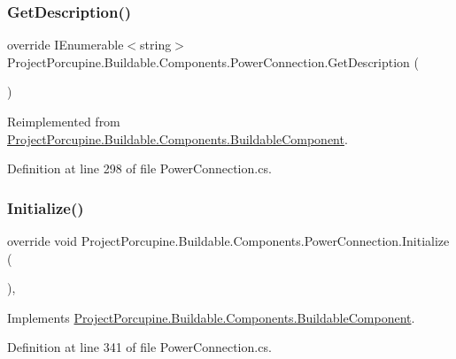 \subsubsection{\texorpdfstring{Get\+Description()}{GetDescription()}}
{\footnotesize\ttfamily override I\+Enumerable$<$string$>$ Project\+Porcupine.\+Buildable.\+Components.\+Power\+Connection.\+Get\+Description (\begin{DoxyParamCaption}{ }\end{DoxyParamCaption})\hspace{0.3cm}{\ttfamily [virtual]}}



Reimplemented from \hyperlink{class_project_porcupine_1_1_buildable_1_1_components_1_1_buildable_component_a78dcaf17ccd463eb4f47fc4b3671b7b5}{Project\+Porcupine.\+Buildable.\+Components.\+Buildable\+Component}.



Definition at line 298 of file Power\+Connection.\+cs.

\mbox{\label{class_project_porcupine_1_1_buildable_1_1_components_1_1_power_connection_a876abd5cb8ac85a2b9b4abae9e645418}} 
\subsubsection{\texorpdfstring{Initialize()}{Initialize()}}
{\footnotesize\ttfamily override void Project\+Porcupine.\+Buildable.\+Components.\+Power\+Connection.\+Initialize (\begin{DoxyParamCaption}{ }\end{DoxyParamCaption})\hspace{0.3cm}{\ttfamily [protected]}, {\ttfamily [virtual]}}



Implements \hyperlink{class_project_porcupine_1_1_buildable_1_1_components_1_1_buildable_component_ac3050db5e9d240e7618ce156920a9dc6}{Project\+Porcupine.\+Buildable.\+Components.\+Buildable\+Component}.



Definition at line 341 of file Power\+Connection.\+cs.

